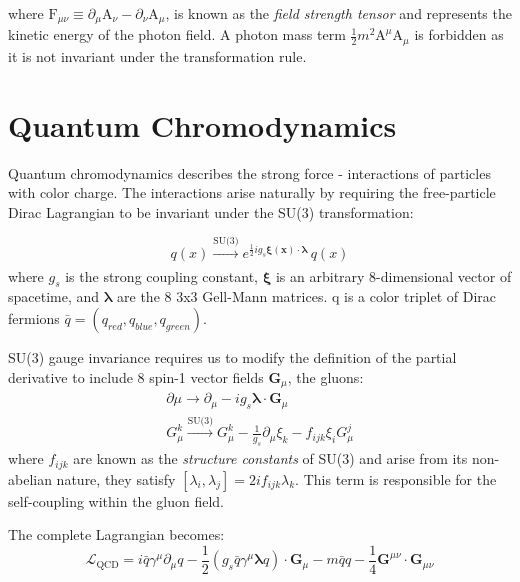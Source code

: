 where $\mathrm{F}_{\mu\nu}\equiv\partial_{\mu}\mathrm{A}_{\nu} - \partial_{\nu}\mathrm{A}_{\mu}$, is known as the \textit{field strength tensor} and represents the kinetic energy of the photon field. A photon mass term $\frac{1}{2}m^{2}\mathrm{A}^{\mu}\mathrm{A}_{\mu}$ is forbidden as it is not invariant under the transformation rule.

\section{Quantum Chromodynamics} 

Quantum chromodynamics describes the strong force - interactions of particles with color charge. The interactions arise naturally by requiring the free-particle Dirac Lagrangian to be invariant under the SU(3) transformation:

\begin{equation}
q(x) \xrightarrow[]{\text{SU(3)}} e^{\frac{1}{2}ig_{s}\bm{\xi(x)}\cdot\bm{\lambda}}\,q(x)
\end{equation}
where $g_{s}$ is the strong coupling constant, $\bm{\xi}$ is an arbitrary 8-dimensional vector of spacetime, and $\bm{\lambda}$ are the 8 3x3 Gell-Mann matrices. q is a color triplet of Dirac fermions $\bar{q} = (q_{red}, q_{blue}, q_{green})$.

SU(3) gauge invariance requires us to modify the definition of the partial derivative to include 8 spin-1 vector fields $\bm{G}_{\mu}$, the gluons:
\begin{equation}
\begin{array}{l}
\partial{\mu} \rightarrow \partial_{\mu} - i g_{s} \bm{\lambda} \cdot \bm{G}_{\mu}\\
G^{k}_{\mu} \xrightarrow[]{\text{SU(3)}} G^{k}_{\mu} - \frac{1}{g_{s}}\partial_{\mu}\xi_{k} - f_{ijk}\xi_{i}G^{j}_{\mu}
\end{array}
\end{equation}
where $f_{ijk}$ are known as the \textit{structure constants} of SU(3) and arise from its non-abelian nature, they satisfy $[\lambda_{i},\lambda_{j}] = 2if_{ijk}\lambda_{k}$. This term is responsible for the self-coupling within the gluon field.

The complete Lagrangian becomes:
\begin{equation}
\mathcal{L}_{\mathrm{QCD}} =
i \bar{q} \gamma^{\mu} \partial_{\mu} q
-  \frac{1}{2} (g_{s} \bar{q} \gamma^{\mu} \bm{\lambda} q) \cdot \textbf{G}_{\mu}
- m \bar{q} q
- \frac{1}{4} \textbf{G}^{\mu\nu} \cdot \textbf{G}_{\mu\nu}
\end{equation}

